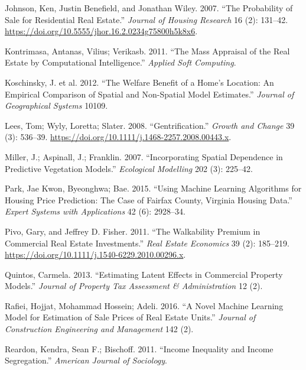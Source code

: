 \documentclass[12pt,]{article}
\begin{document}
\leavevmode\hypertarget{ref-Johnson2007}{}%
Johnson, Ken, Justin Benefield, and Jonathan Wiley. 2007. ``The
Probability of Sale for Residential Real Estate.'' \emph{Journal of
Housing Research} 16 (2): 131--42.
\url{https://doi.org/10.5555/jhor.16.2.0234g75800h5k8x6}.

\leavevmode\hypertarget{ref-Kontrimasa2011}{}%
Kontrimasa, Antanas, Vilius; Verikasb. 2011. ``The Mass Appraisal of the
Real Estate by Computational Intelligence.'' \emph{Applied Soft
Computing}.

\leavevmode\hypertarget{ref-Koschinsky2012}{}%
Koschinsky, J. et al. 2012. ``The Welfare Benefit of a Home's Location:
An Empirical Comparison of Spatial and Non-Spatial Model Estimates.''
\emph{Journal of Geographical Systems} 10109.

\leavevmode\hypertarget{ref-Lees2008}{}%
Lees, Tom; Wyly, Loretta; Slater. 2008. ``Gentrification.'' \emph{Growth
and Change} 39 (3): 536--39.
\url{https://doi.org/10.1111/j.1468-2257.2008.00443.x}.

\leavevmode\hypertarget{ref-Miller2015}{}%
Miller, J.; Aspinall, J.; Franklin. 2007. ``Incorporating Spatial
Dependence in Predictive Vegetation Models.'' \emph{Ecological
Modelling} 202 (3): 225--42.

\leavevmode\hypertarget{ref-Park2015}{}%
Park, Jae Kwon, Byeonghwa; Bae. 2015. ``Using Machine Learning
Algorithms for Housing Price Prediction: The Case of Fairfax County,
Virginia Housing Data.'' \emph{Expert Systems with Applications} 42 (6):
2928--34.

\leavevmode\hypertarget{ref-Pivo2011}{}%
Pivo, Gary, and Jeffrey D. Fisher. 2011. ``The Walkability Premium in
Commercial Real Estate Investments.'' \emph{Real Estate Economics} 39
(2): 185--219. \url{https://doi.org/10.1111/j.1540-6229.2010.00296.x}.

\leavevmode\hypertarget{ref-Quintos2013}{}%
Quintos, Carmela. 2013. ``Estimating Latent Effects in Commercial
Property Models.'' \emph{Journal of Property Tax Assessment \&
Administration} 12 (2).

\leavevmode\hypertarget{ref-Rafiei2016}{}%
Rafiei, Hojjat, Mohammad Hossein; Adeli. 2016. ``A Novel Machine
Learning Model for Estimation of Sale Prices of Real Estate Units.''
\emph{Journal of Construction Engineering and Management} 142 (2).

\leavevmode\hypertarget{ref-Reardon2011}{}%
Reardon, Kendra, Sean F.; Bischoff. 2011. ``Income Inequality and Income
Segregation.'' \emph{American Journal of Sociology}.
\end{document}

